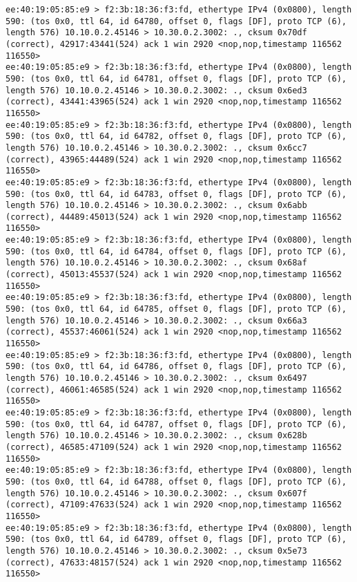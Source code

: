 \documentclass[a4paper,12pt]{article}
\begin{document}
\begin{Verbatim}
ee:40:19:05:85:e9 > f2:3b:18:36:f3:fd, ethertype IPv4 (0x0800), length 590: (tos 0x0, ttl 64, id 64780, offset 0, flags [DF], proto TCP (6), length 576) 10.10.0.2.45146 > 10.30.0.2.3002: ., cksum 0x70df (correct), 42917:43441(524) ack 1 win 2920 <nop,nop,timestamp 116562 116550>
ee:40:19:05:85:e9 > f2:3b:18:36:f3:fd, ethertype IPv4 (0x0800), length 590: (tos 0x0, ttl 64, id 64781, offset 0, flags [DF], proto TCP (6), length 576) 10.10.0.2.45146 > 10.30.0.2.3002: ., cksum 0x6ed3 (correct), 43441:43965(524) ack 1 win 2920 <nop,nop,timestamp 116562 116550>
ee:40:19:05:85:e9 > f2:3b:18:36:f3:fd, ethertype IPv4 (0x0800), length 590: (tos 0x0, ttl 64, id 64782, offset 0, flags [DF], proto TCP (6), length 576) 10.10.0.2.45146 > 10.30.0.2.3002: ., cksum 0x6cc7 (correct), 43965:44489(524) ack 1 win 2920 <nop,nop,timestamp 116562 116550>
ee:40:19:05:85:e9 > f2:3b:18:36:f3:fd, ethertype IPv4 (0x0800), length 590: (tos 0x0, ttl 64, id 64783, offset 0, flags [DF], proto TCP (6), length 576) 10.10.0.2.45146 > 10.30.0.2.3002: ., cksum 0x6abb (correct), 44489:45013(524) ack 1 win 2920 <nop,nop,timestamp 116562 116550>
ee:40:19:05:85:e9 > f2:3b:18:36:f3:fd, ethertype IPv4 (0x0800), length 590: (tos 0x0, ttl 64, id 64784, offset 0, flags [DF], proto TCP (6), length 576) 10.10.0.2.45146 > 10.30.0.2.3002: ., cksum 0x68af (correct), 45013:45537(524) ack 1 win 2920 <nop,nop,timestamp 116562 116550>
ee:40:19:05:85:e9 > f2:3b:18:36:f3:fd, ethertype IPv4 (0x0800), length 590: (tos 0x0, ttl 64, id 64785, offset 0, flags [DF], proto TCP (6), length 576) 10.10.0.2.45146 > 10.30.0.2.3002: ., cksum 0x66a3 (correct), 45537:46061(524) ack 1 win 2920 <nop,nop,timestamp 116562 116550>
ee:40:19:05:85:e9 > f2:3b:18:36:f3:fd, ethertype IPv4 (0x0800), length 590: (tos 0x0, ttl 64, id 64786, offset 0, flags [DF], proto TCP (6), length 576) 10.10.0.2.45146 > 10.30.0.2.3002: ., cksum 0x6497 (correct), 46061:46585(524) ack 1 win 2920 <nop,nop,timestamp 116562 116550>
ee:40:19:05:85:e9 > f2:3b:18:36:f3:fd, ethertype IPv4 (0x0800), length 590: (tos 0x0, ttl 64, id 64787, offset 0, flags [DF], proto TCP (6), length 576) 10.10.0.2.45146 > 10.30.0.2.3002: ., cksum 0x628b (correct), 46585:47109(524) ack 1 win 2920 <nop,nop,timestamp 116562 116550>
ee:40:19:05:85:e9 > f2:3b:18:36:f3:fd, ethertype IPv4 (0x0800), length 590: (tos 0x0, ttl 64, id 64788, offset 0, flags [DF], proto TCP (6), length 576) 10.10.0.2.45146 > 10.30.0.2.3002: ., cksum 0x607f (correct), 47109:47633(524) ack 1 win 2920 <nop,nop,timestamp 116562 116550>
ee:40:19:05:85:e9 > f2:3b:18:36:f3:fd, ethertype IPv4 (0x0800), length 590: (tos 0x0, ttl 64, id 64789, offset 0, flags [DF], proto TCP (6), length 576) 10.10.0.2.45146 > 10.30.0.2.3002: ., cksum 0x5e73 (correct), 47633:48157(524) ack 1 win 2920 <nop,nop,timestamp 116562 116550>

\end{Verbatim}
\end{document}
